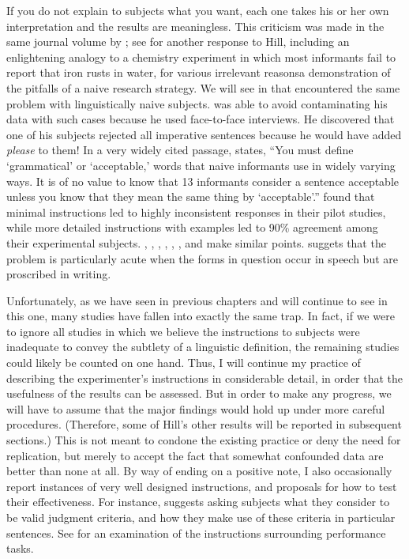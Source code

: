  If you do not explain to subjects what you want, each one takes his or her own interpretation and the results are meaningless. This criticism was made in the same journal volume by \citet{Chomsky1961}; see \citet{Lees1976} for another response to Hill, including an enlightening analogy to a chemistry experiment in which most informants fail to report that iron rusts in water, for various irrelevant reasons\schdash{}a demonstration of the pitfalls of a naive research strategy. We will see in  that \citet{MaclayEtAl1960} encountered the same problem with linguistically naive subjects. \citet{Carden1976a} was able to avoid contaminating his data with such cases because he used face-to-face interviews. He discovered that one of his subjects rejected all imperative sentences because he would have added \textit{please} to them! In a very widely cited passage, \citet{Carden1970a} states, ``You must define `grammatical' or `acceptable,' words that naive informants use in widely varying ways. It is of no value to know that 13 informants consider a sentence acceptable unless you know that they mean the same thing by `acceptable'.'' \citet{BleyVromanEtAl1988} found that minimal instructions led to highly inconsistent responses in their pilot studies, while more detailed instructions with examples led to 90\% agreement among their experimental subjects. \citet{Coleman1965}, \citet{QuirkEtAl1966}, \citet{Schnitser1973}, \citet{Cohen1981}, \citet{Greenbaum1977c}, \citet{Newmeyer1983},
 and \citet{Botha1973} make similar points. \citet{Birdsong1989} suggets that the problem is particularly acute when the forms in question occur in speech but are proscribed in writing.

Unfortunately, as we have seen in previous chapters and will continue to see in this one, many studies have fallen into exactly the same trap. In fact, if we were to ignore all studies in which we believe the instructions to subjects were inadequate to convey the subtlety of a linguistic definition, the remaining studies could likely be counted on one hand. Thus, I will continue my practice of describing the experimenter's instructions in considerable detail, in order that the usefulness of the results can be assessed. But in order to make any progress, we will have to assume that the major findings would hold up under more careful procedures. (Therefore, some of Hill's other results will be reported in subsequent sections.) This is not meant to condone the existing practice or deny the need for replication, but merely to accept the fact that somewhat confounded data are better than none at all. By way of ending on a positive note, I also occasionally report instances of very well designed instructions, and proposals for how to test their effectiveness. For instance, \citet{Chaudron1983} suggests asking subjects what they consider to be valid judgment criteria, and how they make use of these criteria in particular sentences. See \citet{GreenbaumEtAl1970} for an examination of the instructions surrounding performance tasks.

